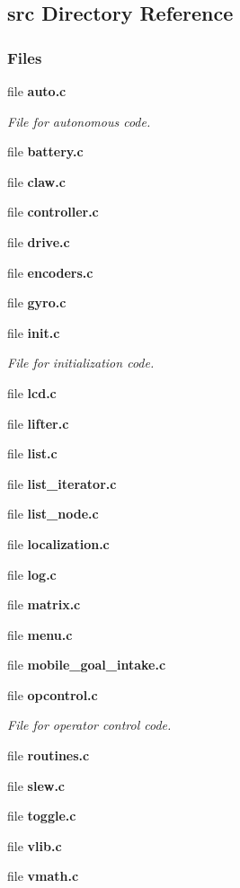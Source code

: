 \subsection{src Directory Reference}
\label{dir_68267d1309a1af8e8297ef4c3efbcdba}
\subsubsection*{Files}
\begin{DoxyCompactItemize}
\item 
file \textbf{ auto.\+c}
\begin{DoxyCompactList}\small\item\em File for autonomous code. \end{DoxyCompactList}\item 
file \textbf{ battery.\+c}
\item 
file \textbf{ claw.\+c}
\item 
file \textbf{ controller.\+c}
\item 
file \textbf{ drive.\+c}
\item 
file \textbf{ encoders.\+c}
\item 
file \textbf{ gyro.\+c}
\item 
file \textbf{ init.\+c}
\begin{DoxyCompactList}\small\item\em File for initialization code. \end{DoxyCompactList}\item 
file \textbf{ lcd.\+c}
\item 
file \textbf{ lifter.\+c}
\item 
file \textbf{ list.\+c}
\item 
file \textbf{ list\+\_\+iterator.\+c}
\item 
file \textbf{ list\+\_\+node.\+c}
\item 
file \textbf{ localization.\+c}
\item 
file \textbf{ log.\+c}
\item 
file \textbf{ matrix.\+c}
\item 
file \textbf{ menu.\+c}
\item 
file \textbf{ mobile\+\_\+goal\+\_\+intake.\+c}
\item 
file \textbf{ opcontrol.\+c}
\begin{DoxyCompactList}\small\item\em File for operator control code. \end{DoxyCompactList}\item 
file \textbf{ routines.\+c}
\item 
file \textbf{ slew.\+c}
\item 
file \textbf{ toggle.\+c}
\item 
file \textbf{ vlib.\+c}
\item 
file \textbf{ vmath.\+c}
\end{DoxyCompactItemize}
